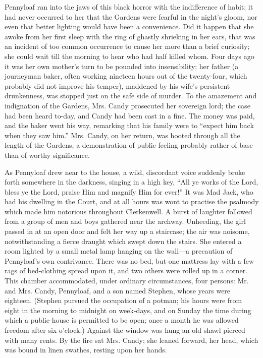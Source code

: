 Pennyloaf ran into the jaws of this black horror with the indifference
of habit; it had never occurred to her that the Gardens were fearful in
the night's gloom, nor even that better lighting would have been a
convenience. Did it happen that she awoke from her first sleep with the
ring of ghastly shrieking in her ears, that was an incident of too
common occurrence to cause her more than a brief curiosity; she could
wait till the morning to hear who had half killed whom. Four days ago it
was her own mother's turn to be pounded into insensibility; her father
(a journeyman baker, often working nineteen hours out of the
twenty-four, which probably did not improve his temper), maddened by
{\protect\hypertarget{180}{}{}}his wife's persistent drunkenness, was
stopped just on the safe side of murder. To the amazement and
indignation of the Gardens, Mrs. Candy prosecuted her sovereign lord;
the case had been heard to-day, and Candy had been cast in a fine. The
money was paid, and the baker went his way, remarking that his family
were to ``expect him back when they saw him.'' Mrs. Candy, on her
return, was hooted through all the length of the Gardens, a
demonstration of public feeling probably rather of base than of worthy
significance.

As Pennyloaf drew near to the house, a wild, discordant voice suddenly
broke forth somewhere in the darkness, singing in a high key, ``All ye
works of the Lord, bless ye the Lord, praise Him and magnify Him for
ever!'' It was Mad Jack, who had his dwelling in the Court, and at all
hours was wont to practise the psalmody which made him notorious
throughout Clerkenwell. A burst of laughter followed from a group of men
and boys gathered near the archway. Unheeding,
{\protect\hypertarget{181}{}{}}the girl passed in at an open door and
felt her way up a staircase; the air was noisome, notwithstanding a
fierce draught which swept down the stairs. She entered a room lighted
by a small metal lamp hanging on the wall---a precaution of Pennyloaf's
own contrivance. There was no bed, but one mattress lay with a few rags
of bed-clothing spread upon it, and two others were rolled up in a
corner. This chamber accommodated, under ordinary circumstances, four
persons: Mr. and Mrs. Candy, Pennyloaf, and a son named Stephen, whose
years were eighteen. (Stephen pursued the occupation of a potman; his
hours were from eight in the morning to midnight on week-days, and on
Sunday the time during which a public-house is permitted to be open;
once a month he was allowed freedom after six o'clock.) Against the
window was hung an old shawl pierced with many rents. By the fire sat
Mrs. Candy; she leaned forward, her head, which was bound in linen
swathes, resting upon her hands.


